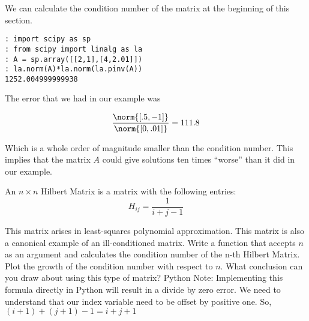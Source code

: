 We can calculate the condition number of the matrix at the beginning of this section.

\begin{lstlisting}
: import scipy as sp
: from scipy import linalg as la
: A = sp.array([[2,1],[4,2.01]])
: la.norm(A)*la.norm(la.pinv(A))
1252.004999999938
\end{lstlisting}

The error that we had in our example was

\[
\frac{\norm{[.5, -1]}}{\norm{[0, .01]}} = 111.8
\]

Which is a whole order of magnitude smaller than the condition number. This implies that the matrix $A$ could give solutions ten times ``worse'' than it did in our example.

\begin{problem}
An $n \times n$ Hilbert Matrix is a matrix with the following entries:
\[
H_{ij} = \frac{1}{i + j -1}
\]

This matrix arises in least-squares polynomial approximation. This matrix is also a canonical example of an ill-conditioned matrix. Write a function that accepts $n$ as an argument and calculates the condition number of the n-th Hilbert Matrix. Plot the growth of the condition number with respect to $n$. What conclusion can you draw about using this type of matrix?
Python Note: Implementing this formula directly in Python will result in a divide by zero error.  We need to understand that our index variable need to be offset by positive one.  So, $(i+1)+(j+1)-1 = i+j+1$
\end{problem}
